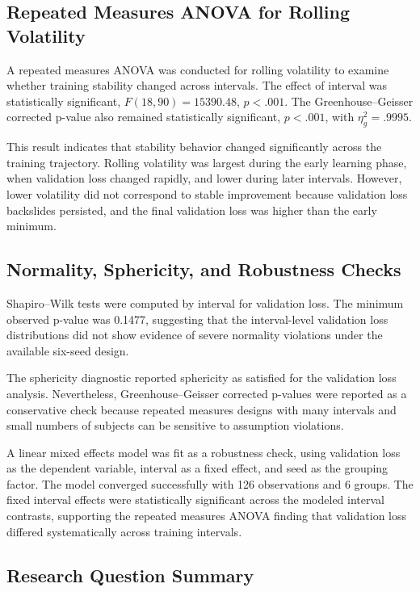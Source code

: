 \documentclass{article}
\begin{document}
\subsection{Repeated Measures ANOVA for Rolling Volatility}

A repeated measures ANOVA was conducted for rolling volatility to examine whether training stability changed across intervals. The effect of interval was statistically significant, $F(18, 90) = 15390.48$, $p < .001$. The Greenhouse--Geisser corrected p-value also remained statistically significant, $p < .001$, with $\eta^2_g = .9995$.

This result indicates that stability behavior changed significantly across the training trajectory. Rolling volatility was largest during the early learning phase, when validation loss changed rapidly, and lower during later intervals. However, lower volatility did not correspond to stable improvement because validation loss backslides persisted, and the final validation loss was higher than the early minimum.

\subsection{Normality, Sphericity, and Robustness Checks}

Shapiro--Wilk tests were computed by interval for validation loss. The minimum observed p-value was 0.1477, suggesting that the interval-level validation loss distributions did not show evidence of severe normality violations under the available six-seed design.

The sphericity diagnostic reported sphericity as satisfied for the validation loss analysis. Nevertheless, Greenhouse--Geisser corrected p-values were reported as a conservative check because repeated measures designs with many intervals and small numbers of subjects can be sensitive to assumption violations.

A linear mixed effects model was fit as a robustness check, using validation loss as the dependent variable, interval as a fixed effect, and seed as the grouping factor. The model converged successfully with 126 observations and 6 groups. The fixed interval effects were statistically significant across the modeled interval contrasts, supporting the repeated measures ANOVA finding that validation loss differed systematically across training intervals.

\subsection{Research Question Summary}
\end{document}
